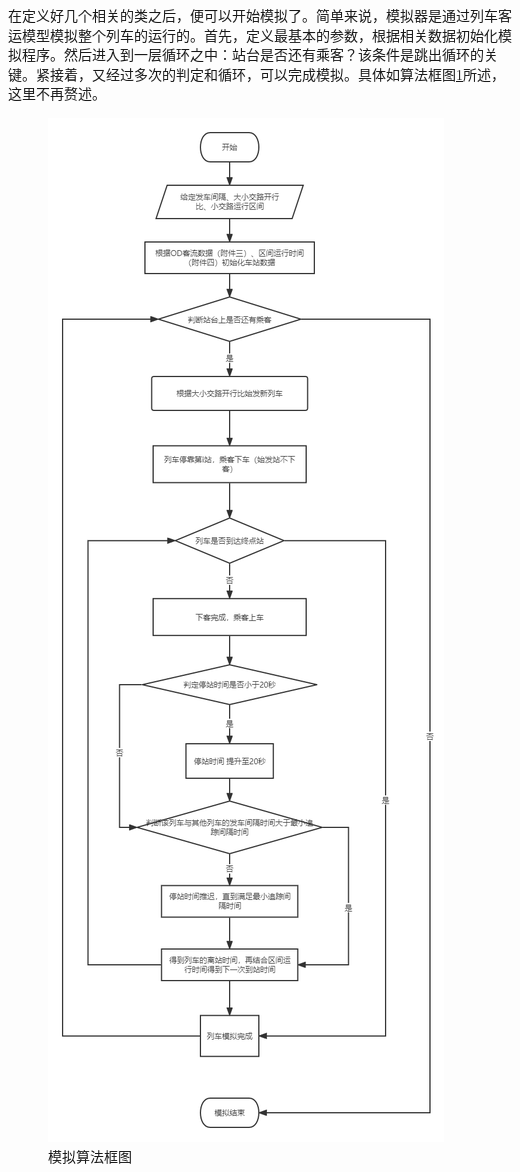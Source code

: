 在定义好几个相关的类之后，便可以开始模拟了。简单来说，模拟器是通过列车客运模型模拟整个列车的运行的。首先，定义最基本的参数，根据相关数据初始化模拟程序。然后进入到一层循环之中：站台是否还有乘客？该条件是跳出循环的关键。紧接着，又经过多次的判定和循环，可以完成模拟。具体如算法框图\ref{figure170144}所述，这里不再赘述。

\begin{figure}
    \centering
    \includegraphics[scale=0.38]{res/figure170144.png}
    \caption{模拟算法框图}
    \label{figure170144}
\end{figure}

